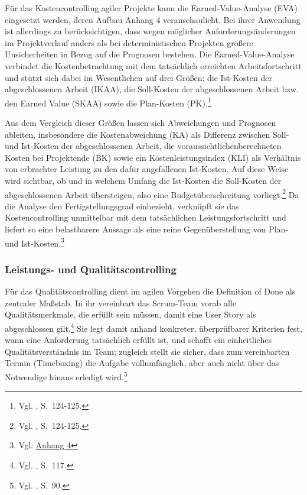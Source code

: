 \documentclass[
    12pt, 
    a4paper,
    ]{scrartcl} %
\begin{document}
Für das Kostencontrolling agiler Projekte kann die Earned-Value-Analyse (EVA) eingesetzt werden, deren Aufbau Anhang 4 veranschaulicht.
Bei ihrer Anwendung ist allerdings zu berücksichtigen, dass wegen möglicher Anforderungsänderungen im Projektverlauf anders als bei deterministischen Projekten größere Unsicherheiten in Bezug auf die Prognosen bestehen. Die Earned-Value-Analyse verbindet die Kostenbetrachtung mit dem tatsächlich erreichten Arbeitsfortschritt und stützt sich dabei im Wesentlichen auf drei Größen: die Ist-Kosten der abgeschlossenen Arbeit (IKAA), die Soll-Kosten der abgeschlossenen Arbeit bzw. den Earned Value (SKAA) sowie die Plan-Kosten (PK).\footnote{Vgl. \cite{Mayrhofer_HybridesProjektmanagement}, S.~124-125.}

Aus dem Vergleich dieser Größen lassen sich Abweichungen und Prognosen ableiten, insbesondere die Kostenabweichung (KA) als Differenz zwischen Soll- und Ist-Kosten der abgeschlossenen Arbeit, die voraussichtlichenberechneten Kosten bei Projektende (BK) sowie ein Kostenleistungsindex (KLI) als Verhältnis von erbrachter Leistung zu den dafür angefallenen Ist-Kosten. Auf diese Weise wird sichtbar, ob und in welchem Umfang die Ist-Kosten die Soll-Kosten der abgeschlossenen Arbeit übersteigen, also eine Budgetüberschreitung vorliegt.\footnote{Vgl. \cite{Mayrhofer_HybridesProjektmanagement}, S.~124-125.} Da die Analyse den Fertigstellungsgrad einbezieht, verknüpft sie das Kostencontrolling unmittelbar mit dem tatsächlichen Leistungsfortschritt und liefert so eine belastbarere Aussage als eine reine Gegenüberstellung von Plan- und Ist-Kosten.\footnote{Vgl. \hyperref[sec:Anhang4]{Anhang 4}}

\subsubsection{Leistungs- und Qualitätscontrolling}
Für das Qualitätscontrolling dient im agilen Vorgehen die Definition of Done als zentraler Maßstab. In ihr vereinbart das Scrum-Team vorab alle Qualitätsmerkmale, die erfüllt sein müssen, damit eine User Story als abgeschlossen gilt.\footnote{Vgl. \cite{Beiderwieden_ProjektmanagementIT}, S.~117.} Sie legt damit anhand konkreter, überprüfbarer Kriterien fest, wann eine Anforderung tatsächlich erfüllt ist, und schafft ein einheitliches Qualitätsverständnis im Team; zugleich stellt sie sicher, dass zum vereinbarten Termin (Timeboxing) die Aufgabe vollumfänglich, aber auch nicht über das Notwendige hinaus erledigt wird.\footnote{Vgl. \cite{Lang_Schops_Praxisleitfaden}, S.~90.}
\end{document}
